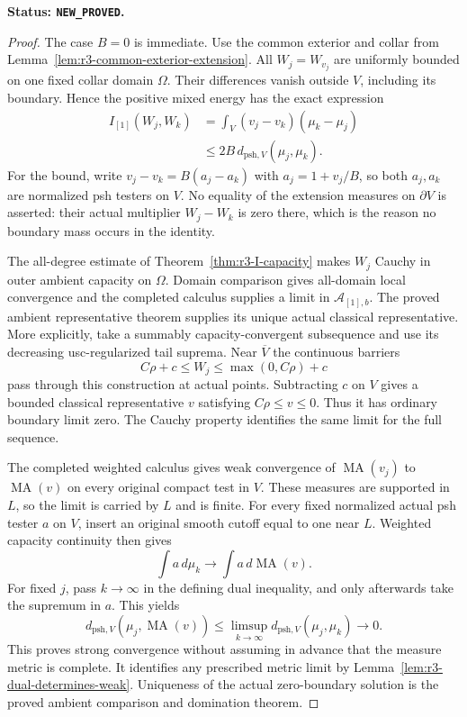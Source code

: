 \documentclass[11pt,a4paper]{article}
\numberwithin{equation}{section}
\theoremstyle{definition}
\theoremstyle{remark}
\begin{document}
\noindent\textbf{Status: \texttt{NEW\_PROVED}.}

\begin{proof}
The case $B=0$ is immediate.  Use the common exterior and collar
from Lemma~\ref{lem:r3-common-exterior-extension}.  All $W_j=W_{v_j}$
are uniformly bounded on one fixed collar domain $\Omega$.  Their
differences vanish outside $V$, including its boundary.  Hence the
positive mixed energy has the exact expression
\[
 \begin{split}
 I_{[1]}(W_j,W_k)
 &=\int_V(v_j-v_k)(\mu_k-\mu_j)\\
 &\leq2B\,d_{\mathrm{psh},V}(\mu_j,\mu_k).
 \end{split}
\]
For the bound, write $v_j-v_k=B(a_j-a_k)$ with
$a_j=1+v_j/B$, so both $a_j,a_k$ are normalized psh testers on $V$.
No equality of the extension measures on $\partial V$ is asserted:
their actual multiplier $W_j-W_k$ is zero there, which is the
reason no boundary mass occurs in the identity.

The all-degree estimate of Theorem~\ref{thm:r3-I-capacity} makes
$W_j$ Cauchy in outer ambient capacity on $\Omega$.  Domain
comparison gives all-domain local convergence and the completed
calculus supplies a limit in $\mathcal A_{[1],b}$.  The proved
ambient representative theorem supplies its unique actual classical
representative.  More explicitly, take a summably capacity-convergent
subsequence and use its decreasing usc-regularized tail suprema.
Near $\overline V$ the continuous barriers
\[
 C\rho+c\leq W_j\leq\max(0,C\rho)+c
\]
pass through this construction at actual points.  Subtracting $c$
on $V$ gives a bounded classical representative $v$ satisfying
$C\rho\leq v\leq0$.  Thus it has ordinary boundary limit zero.
The Cauchy property identifies the same limit for the full sequence.

The completed weighted calculus gives weak convergence of
$\operatorname{MA}(v_j)$ to $\operatorname{MA}(v)$ on every original
compact test in $V$.  These measures are supported in $L$, so the
limit is carried by $L$ and is finite.  For every fixed normalized
actual psh tester $a$ on $V$, insert an original smooth cutoff equal
to one near $L$.  Weighted capacity continuity then gives
\[
 \int a\,d\mu_k\longrightarrow
              \int a\,d\operatorname{MA}(v).
\]
For fixed $j$, pass $k\to\infty$ in the defining dual inequality,
and only afterwards take the supremum in $a$.  This yields
\[
 d_{\mathrm{psh},V}(\mu_j,\operatorname{MA}(v))
       \leq\limsup_{k\to\infty}d_{\mathrm{psh},V}(\mu_j,\mu_k)
       \longrightarrow0.
\]
This proves strong convergence without assuming in advance that
the measure metric is complete.  It identifies any prescribed
metric limit by Lemma~\ref{lem:r3-dual-determines-weak}.
Uniqueness of the actual zero-boundary solution is the proved
ambient comparison and domination theorem.
\end{proof}
\end{document}
